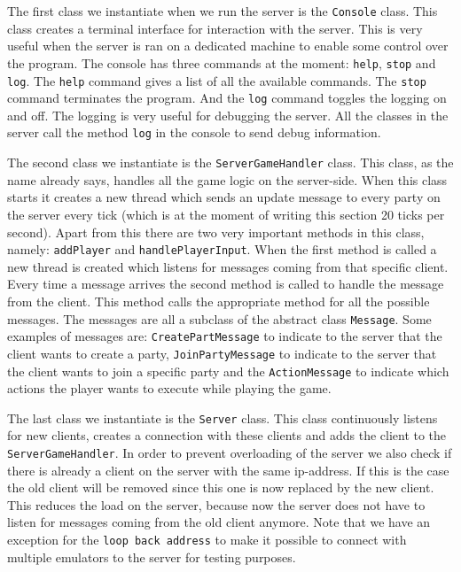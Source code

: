\documentclass[../main.tex]{subfiles}
\begin{document}
        The first class we instantiate when we run the server is the \texttt{Console} class. This class creates a terminal interface for interaction with the server. This is very useful when the server is ran on a dedicated machine to enable some control over the program. The console has three commands at the moment: \texttt{help}, \texttt{stop} and \texttt{log}. The \texttt{help} command gives a list of all the available commands. The \texttt{stop} command terminates the program. And the \texttt{log} command toggles the logging on and off. The logging is very useful for debugging the server. All the classes in the server call the method \texttt{log} in the console to send debug information.

        The second class we instantiate is the \texttt{ServerGameHandler} class. This class, as the name already says, handles all the game logic on the server-side. When this class starts it creates a new thread which sends an update message to every party on the server every tick (which is at the moment of writing this section 20 ticks per second). Apart from this there are two very important methods in this class, namely: \texttt{addPlayer} and \texttt{handlePlayerInput}. When the first method is called a new thread is created which listens for messages coming from that specific client. Every time a message arrives the second method is called to handle the message from the client. This method calls the appropriate method for all the possible messages. The messages are all a subclass of the abstract class \texttt{Message}. Some examples of messages are: \texttt{CreatePartMessage} to indicate to the server that the client wants to create a party, \texttt{JoinPartyMessage} to indicate to the server that the client wants to join a specific party and the \texttt{ActionMessage} to indicate which actions the player wants to execute while playing the game.

        The last class we instantiate is the \texttt{Server} class. This class continuously listens for new clients, creates a connection with these clients and adds the client to the \texttt{ServerGameHandler}. In order to prevent overloading of the server we also check if there is already a client on the server with the same ip-address. If this is the case the old client will be removed since this one is now replaced by the new client. This reduces the load on the server, because now the server does not have to listen for messages coming from the old client anymore. Note that we have an exception for the \texttt{loop back address} to make it possible to connect with multiple emulators to the server for testing purposes.
\end{document}
